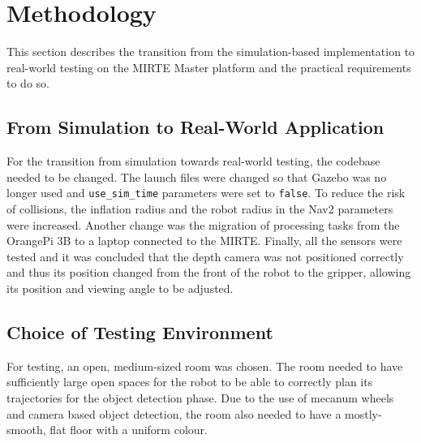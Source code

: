 \section{Methodology}

% 
% 
% 
% 
% 

This section describes the transition from the simulation-based implementation to real-world testing on the MIRTE Master platform and the practical requirements to do so.

\subsection{From Simulation to Real-World Application}

For the transition from simulation towards real-world testing, the codebase needed to be changed. The launch files were changed so that Gazebo was no longer used and \texttt{use\_sim\_time} parameters were set to \texttt{false}. To reduce the risk of collisions, the inflation radius and the robot radius in the Nav2 parameters were increased. Another change was the migration of processing tasks from the OrangePi 3B to a laptop connected to the MIRTE. Finally, all the sensors were tested and it was concluded that the depth camera was not positioned correctly and thus its position changed from the front of the robot to the gripper, allowing its position and viewing angle to be adjusted.

\subsection{Choice of Testing Environment}

For testing, an open, medium-sized room was chosen. The room needed to have sufficiently large open spaces for the robot to be able to correctly plan its trajectories for the object detection phase. Due to the use of mecanum wheels and camera based object detection, the room also needed to have a mostly-smooth, flat floor with a uniform colour.

